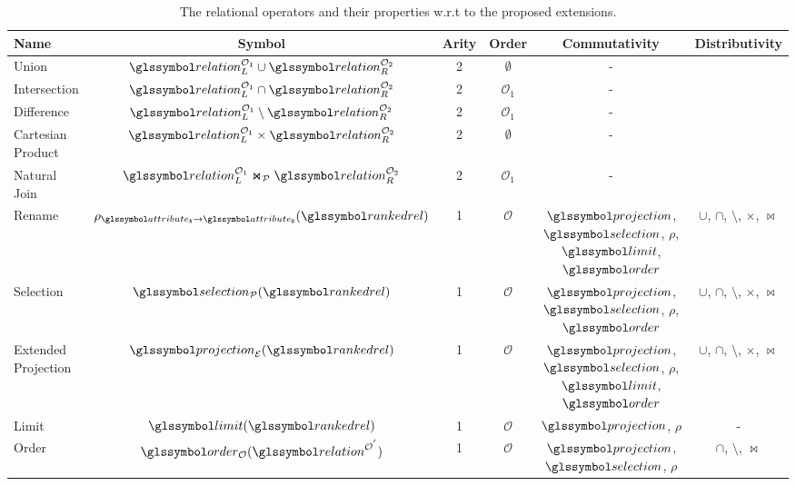\begin{table}
    \caption{The relational operators and their properties w.r.t to the proposed extensions.}
    \label{table:ext_algebraic_properties}
    \begin{tabular}{| l | c | c | c | c | c |}
        \hline
       \textbf{Name} & \textbf{Symbol} & \textbf{Arity} & \textbf{Order} & \textbf{Commutativity} & \textbf{Distributivity}\\ 
        \hline
        \hline
        Union & $\relation_{L}^{\mathcal{O}_1} \cup \relation_{R}^{\mathcal{O}_2}$ & 2 & $\emptyset$ & - &\\
        \hline
        Intersection & $\relation_{L}^{\mathcal{O}_1} \cap \relation_{R}^{\mathcal{O}_2}$ & 2 & $\mathcal{O}_{1}$ & - &\\
        \hline
        Difference & $\relation_{L}^{\mathcal{O}_1} \setminus \relation_{R}^{\mathcal{O}_2}$  & 2 & $\mathcal{O}_{1}$ & - &\\
        \hline
        Cartesian Product & $\relation_{L}^{\mathcal{O}_1} \times \relation_{R}^{\mathcal{O}_2}$ & 2 & $\emptyset$ & - &\\
        \hline
        Natural Join & $\relation_{L}^{\mathcal{O}_1} \Join_{\mathcal{P}} \relation_{R}^{\mathcal{O}_2}$ & 2 & $\mathcal{O}_{1}$ & - &\\
        \hline
        Rename & $\rho_{\attribute_\mathtt{A} \rightarrow \attribute_\mathtt{B}}(\rankedrel)$ &  1 & $\mathcal{O}$ & $\projection$, $\selection$, $\rho$, $\limit$, $\order$ & $\cup$, $\cap$, $\setminus$, $\times$, $\Join$\\
        \hline
        Selection & $\selection_{\mathcal{P}}(\rankedrel)$ &  1 & $\mathcal{O}$ & $\projection$, $\selection$, $\rho$, $\order$ & $\cup$, $\cap$, $\setminus$, $\times$, $\Join$\\
        \hline
        Extended Projection & $\projection_{\mathcal{E}}(\rankedrel)$ &  1 & $\mathcal{O}$ & $\projection$, $\selection$, $\rho$, $\limit$, $\order$ & $\cup$, $\cap$, $\setminus$, $\times$, $\Join$\\
        \hline
        Limit & $\limit(\rankedrel)$ & 1 & $\mathcal{O}$ & $\projection$, $\rho$ & - \\
        \hline
        Order & $\order_{\mathcal{O}}(\relation^{\mathcal{O}^{'}})$ & 1 & $\mathcal{O}$ &  $\projection$, $\selection$, $\rho$ & $\cap$, $\setminus$, $\Join$\\
        \hline
    \end{tabular}
\end{table}

